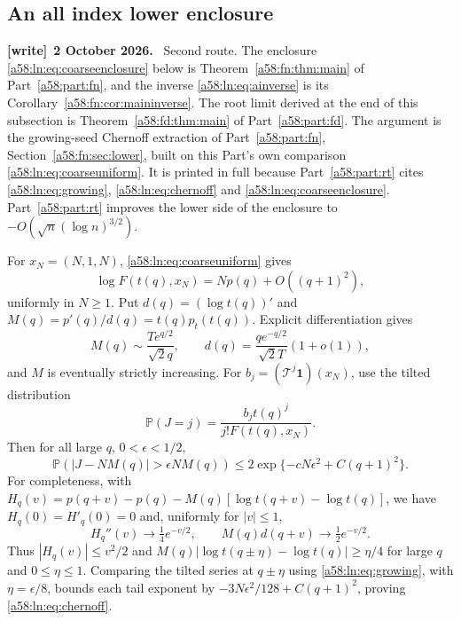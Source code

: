\documentclass[11pt,letterpaper]{article}
\theoremstyle{remark}
\newcommand{\TT}{\mathcal T}
\newcommand{\one}{\mathbf 1}
\newcommand{\Pp}{\mathbb P}
\newenvironment{writenote}[1][]{\par\smallskip\begingroup\small
 \noindent\textbf{[write]}\if\relax\detokenize{#1}\relax\else~\textbf{#1.}\fi\ }%
 {\par\endgroup\smallskip}
\begin{document}
\subsection{An all index lower enclosure}\label{a58:ln:sec:allindex}
\begin{writenote}[2 October 2026]
Second route. The enclosure \eqref{a58:ln:eq:coarseenclosure} below is Theorem~\ref{a58:fn:thm:main} of Part~\ref{a58:part:fn}, and the inverse \eqref{a58:ln:eq:ainverse} is its Corollary~\ref{a58:fn:cor:maininverse}. The root limit derived at the end of this subsection is Theorem~\ref{a58:fd:thm:main} of Part~\ref{a58:part:fd}. The argument is the growing-seed Chernoff extraction of Part~\ref{a58:part:fn}, Section~\ref{a58:fn:sec:lower}, built on this Part's own comparison \eqref{a58:ln:eq:coarseuniform}. It is printed in full because Part~\ref{a58:part:rt} cites \eqref{a58:ln:eq:growing}, \eqref{a58:ln:eq:chernoff} and \eqref{a58:ln:eq:coarseenclosure}. Part~\ref{a58:part:rt} improves the lower side of the enclosure to $-O(\sqrt n(\log n)^{3/2})$.
\end{writenote}
For $x_N=(N,1,N)$, \eqref{a58:ln:eq:coarseuniform} gives
\begin{equation}\label{a58:ln:eq:growing}
 \log F(t(q),x_N)=Np(q)+O((q+1)^2),
\end{equation}
uniformly in $N\ge1$. Put $d(q)=(\log t(q))'$ and
$M(q)=p'(q)/d(q)=t(q)p_t(t(q))$. Explicit differentiation gives
\[
 M(q)\sim\frac{T e^{q/2}}{\sqrt2q},\qquad
 d(q)=\frac{qe^{-q/2}}{\sqrt2T}(1+o(1)),
\]
and $M$ is eventually strictly increasing.
For $b_j=(\TT^j\one)(x_N)$, use the tilted distribution
\[\Pp(J=j)=\frac{b_jt(q)^j}{j!F(t(q),x_N)}.\]
Then for all large $q$, $0<\epsilon<1/2$,
\begin{equation}\label{a58:ln:eq:chernoff}
 \Pp(|J-NM(q)|>\epsilon NM(q))
 \le2\exp\{-cN\epsilon^2+C(q+1)^2\}.
\end{equation}
For completeness, with
$H_q(v)=p(q+v)-p(q)-M(q)[\log t(q+v)-\log t(q)]$,
we have $H_q(0)=H'_q(0)=0$ and, uniformly for $|v|\le1$,
\[
 H_q''(v)\to\tfrac14e^{-v/2},\qquad M(q)d(q+v)\to\tfrac12e^{-v/2}.
\]
Thus $|H_q(v)|\le v^2/2$ and
$M(q)|\log t(q\pm\eta)-\log t(q)|\ge\eta/4$ for large $q$ and
$0\le\eta\le1$. Comparing the tilted series at $q\pm\eta$ using
\eqref{a58:ln:eq:growing}, with $\eta=\epsilon/8$, bounds each tail exponent by
$-3N\epsilon^2/128+C(q+1)^2$, proving \eqref{a58:ln:eq:chernoff}.
\end{document}
